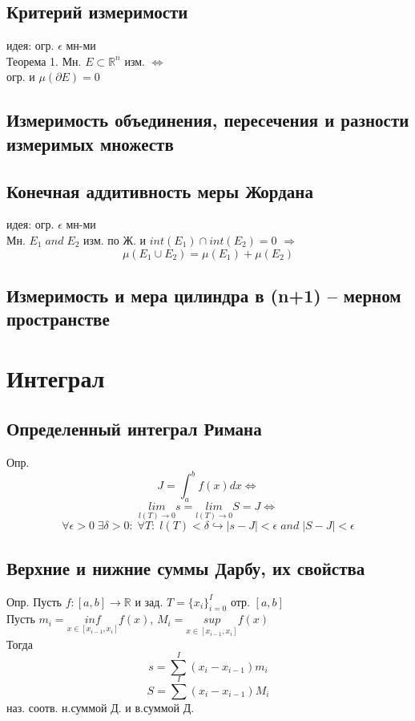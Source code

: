 \documentclass{article}
\begin{document}
\subsection{Критерий измеримости}
идея: огр. $\epsilon$ мн-ми \\
Теорема 1. Мн. $E \subset \mathbb R^n$ изм. $\Leftrightarrow$ \\
огр. и $\mu (\partial E)=0$
\subsection{Измеримость объединения, пересечения и разности измеримых
множеств}
\subsection{Конечная аддитивность меры Жордана}
идея: огр. $\epsilon$ мн-ми \\
Мн. $E_1 \; and \; E_2$ изм. по Ж. и $int (E_1) \cap int (E_2) = 0$ $\Rightarrow$
\begin{equation*}
    \mu (E_1 \cup E_2) = \mu (E_1) + \mu (E_2)
\end{equation*}
\subsection{Измеримость и мера цилиндра в (n+1) – мерном пространстве}


\newpage
\section{Интеграл}
\subsection{Определенный интеграл Римана}
Опр.
\begin{equation*}
    J = \int_a^b f(x) dx \Leftrightarrow
\end{equation*}
\begin{equation*}
    \underset{l(T) \rightarrow 0}{lim} s = \underset{l(T) \rightarrow 0}{lim} S = J \Leftrightarrow
\end{equation*}
\begin{equation*}
    \forall \epsilon >0 \; \exists \delta > 0: \; \forall T: \; l(T)<\delta \hookrightarrow |s-J|<\epsilon \; and \; |S-J|<\epsilon
\end{equation*}
\subsection{Верхние и нижние суммы Дарбу, их свойства}
Опр. Пусть $f:[a,b] \rightarrow \mathbb R$ и зад. $T = \{ x_i \}_{i=0}^I$ отр. $[a,b]$ \\
Пусть $ m_i = \underset{x \in [x_{i-1}, x_i]}{inf} f(x) $, $ M_i = \underset{x \in [x_{i-1}, x_i]}{sup} f(x) $ \\
Тогда
\begin{equation*}
    s = \sum^I (x_i - x_{i-1})m_i
\end{equation*}
\begin{equation*}
    S = \sum^I (x_i - x_{i-1})M_i
\end{equation*}
наз. соотв. н.суммой Д. и в.суммой Д.
\end{document}
